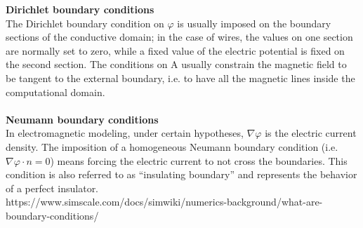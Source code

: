 \begin{tcolorbox}[title = Boundary conditions]
    \textbf{Dirichlet boundary conditions}\\
    The Dirichlet boundary condition on $\varphi$ is usually imposed on the boundary sections of the conductive domain; in the case of wires, the values on one section are normally set to zero, while a fixed value of the electric potential is fixed on the second section. The conditions on A usually constrain the magnetic field to be tangent to the external boundary, i.e. to have all the magnetic lines inside the computational domain.\\
    \\
    \textbf{Neumann boundary conditions}\\
    In electromagnetic modeling, under certain hypotheses, $\nabla\varphi$ is the electric current density. The imposition of a homogeneous Neumann boundary condition (i.e.$\nabla\varphi \cdot n =0$) means forcing the electric current to not cross the boundaries. This condition is also referred to as “insulating boundary” and represents the behavior of a perfect insulator.\\
    \tcblower
    https://www.simscale.com/docs/simwiki/numerics-background/what-are-boundary-conditions/
    \end{tcolorbox}


